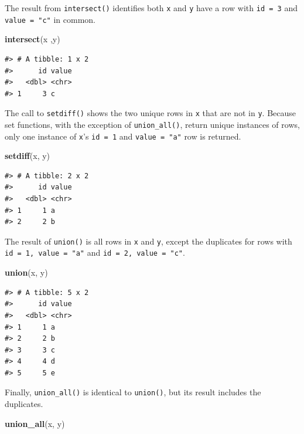 \documentclass[
  11pt,
]{krantz}
\newenvironment{Shaded}{\begin{snugshade}}{\end{snugshade}}
\newcommand{\KeywordTok}[1]{\textcolor[rgb]{0.13,0.29,0.53}{\textbf{#1}}}
\newcommand{\NormalTok}[1]{#1}
\theoremstyle{definition}
\theoremstyle{definition}
\theoremstyle{definition}
\theoremstyle{definition}
\theoremstyle{remark}
\begin{document}
The result from \texttt{intersect()} identifies both \texttt{x} and \texttt{y} have a row with \texttt{id\ =\ 3} and \texttt{value\ =\ "c"} in common.

\begin{Shaded}
\begin{Highlighting}[]
\KeywordTok{intersect}\NormalTok{(x ,y)}
\end{Highlighting}
\end{Shaded}

\begin{verbatim}
#> # A tibble: 1 x 2
#>      id value
#>   <dbl> <chr>
#> 1     3 c
\end{verbatim}

The call to \texttt{setdiff()} shows the two unique rows in \texttt{x} that are not in \texttt{y}. Because set functions, with the exception of \texttt{union\_all()}, return unique instances of rows, only one instance of \texttt{x}'s \texttt{id\ =\ 1} and \texttt{value\ =\ "a"} row is returned.

\begin{Shaded}
\begin{Highlighting}[]
\KeywordTok{setdiff}\NormalTok{(x, y)}
\end{Highlighting}
\end{Shaded}

\begin{verbatim}
#> # A tibble: 2 x 2
#>      id value
#>   <dbl> <chr>
#> 1     1 a    
#> 2     2 b
\end{verbatim}

The result of \texttt{union()} is all rows in \texttt{x} and \texttt{y}, except the duplicates for rows with \texttt{id\ =\ 1,\ value\ =\ "a"} and \texttt{id\ =\ 2,\ value\ =\ "c"}.

\begin{Shaded}
\begin{Highlighting}[]
\KeywordTok{union}\NormalTok{(x, y)}
\end{Highlighting}
\end{Shaded}

\begin{verbatim}
#> # A tibble: 5 x 2
#>      id value
#>   <dbl> <chr>
#> 1     1 a    
#> 2     2 b    
#> 3     3 c    
#> 4     4 d    
#> 5     5 e
\end{verbatim}

Finally, \texttt{union\_all()} is identical to \texttt{union()}, but its result includes the duplicates.

\begin{Shaded}
\begin{Highlighting}[]
\KeywordTok{union\_all}\NormalTok{(x, y)}
\end{Highlighting}
\end{Shaded}
\end{document}
